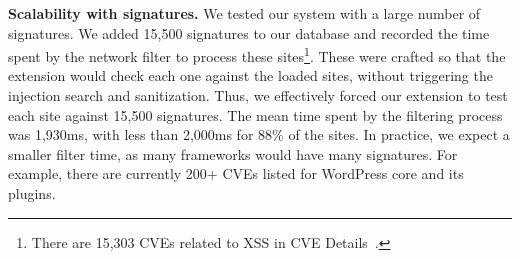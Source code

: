 \textbf{Scalability with signatures.} We tested our system with a large number of signatures. We added
15,500 signatures to our database and recorded the time spent by the
network filter to process these sites\footnote{There are 15,303 CVEs
  related to XSS in CVE Details~\cite{xsscves}.}. These
were crafted so that the extension would check each one against the
loaded sites, without triggering the injection search and
sanitization. Thus, we effectively forced our
extension to test each site against 15,500 signatures. The mean time
spent by the filtering process was 1,930ms, with less than 2,000ms for
88\% of the sites. In practice, we expect a smaller filter time,
as many frameworks would have many signatures. For example, there are
currently 200+ CVEs listed for WordPress core and its plugins.


